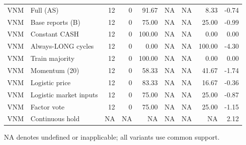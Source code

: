 \begin{table}[htbp]
\begin{tabular}{llrrrrrrr}
VNM & Full (AS) & 12 & 0 & 91.67 & NA & NA & 8.33 & -0.74 \\
VNM & Base reports (B) & 12 & 0 & 75.00 & NA & NA & 25.00 & -0.99 \\
VNM & Constant CASH & 12 & 0 & 100.00 & NA & NA & 0.00 & 0.00 \\
VNM & Always-LONG cycles & 12 & 0 & 0.00 & NA & NA & 100.00 & -4.30 \\
VNM & Train majority & 12 & 0 & 100.00 & NA & NA & 0.00 & 0.00 \\
VNM & Momentum (20) & 12 & 0 & 58.33 & NA & NA & 41.67 & -1.74 \\
VNM & Logistic price & 12 & 0 & 83.33 & NA & NA & 16.67 & -0.36 \\
VNM & Logistic market inputs & 12 & 0 & 75.00 & NA & NA & 25.00 & -0.87 \\
VNM & Factor vote & 12 & 0 & 75.00 & NA & NA & 25.00 & -1.15 \\
VNM & Continuous hold & NA & NA & NA & NA & NA & NA & 2.12 \\
\hline
\end{tabular}
\par\smallskip\footnotesize NA denotes undefined or inapplicable; all variants use common support.
\end{table}
